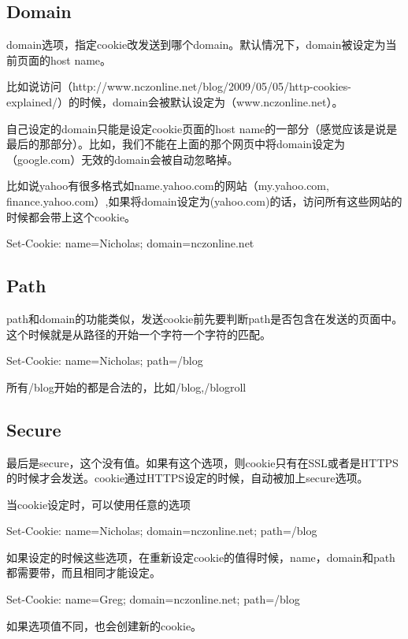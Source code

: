 \subsection{Domain}

domain选项，指定cookie改发送到哪个domain。默认情况下，domain被设定为当前页面的host name。

比如说访问（http://www.nczonline.net/blog/2009/05/05/http-cookies-explained/）的时候，domain会被默认设定为（www.nczonline.net）。

自己设定的domain只能是设定cookie页面的host name的一部分（感觉应该是说是最后的那部分）。比如，我们不能在上面的那个网页中将domain设定为（google.com）无效的domain会被自动忽略掉。

比如说yahoo有很多格式如name.yahoo.com的网站（my.yahoo.com, finance.yahoo.com）,如果将domain设定为(yahoo.com)的话，访问所有这些网站的时候都会带上这个cookie。

\begin{HTML5}
Set-Cookie: name=Nicholas; domain=nczonline.net
\end{HTML5}

\subsection{Path}
path和domain的功能类似，发送cookie前先要判断path是否包含在发送的页面中。这个时候就是从路径的开始一个字符一个字符的匹配。

\begin{HTML5}
Set-Cookie: name=Nicholas; path=/blog
\end{HTML5}
所有/blog开始的都是合法的，比如/blog,/blogroll
\subsection{Secure}

最后是secure，这个没有值。如果有这个选项，则cookie只有在SSL或者是HTTPS的时候才会发送。cookie通过HTTPS设定的时候，自动被加上secure选项。

当cookie设定时，可以使用任意的选项
\begin{HTML5}
Set-Cookie: name=Nicholas; domain=nczonline.net; path=/blog
\end{HTML5}
如果设定的时候这些选项，在重新设定cookie的值得时候，name，domain和path都需要带，而且相同才能设定。
\begin{HTML5}
Set-Cookie: name=Greg; domain=nczonline.net; path=/blog
\end{HTML5}
如果选项值不同，也会创建新的cookie。

